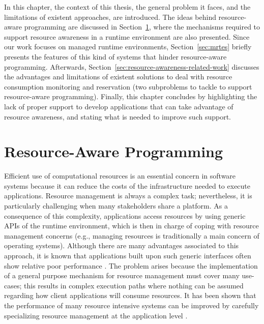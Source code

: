 In this chapter, the context of this thesis, the general problem it faces, and the limitations of existent approaches, are introduced.
The ideas behind resource-aware programming are discussed in Section~\ref{sec:resource-awareness},
where the mechanisms required to support resource awareness in a runtime environment are also presented.
Since our work focuses on managed runtime environments, Section~\ref{sec:mrtes} briefly presents the features of this kind of systems that hinder resource-aware programming.
Afterwards, Section~\ref{sec:resource-awareness-related-work} discusses the advantages and limitations of existent solutions to deal with resource consumption monitoring and reservation (two subproblems to tackle to support resource-aware programming).
Finally, this chapter concludes by highlighting the lack of proper support to develop applications that can take advantage of resource awareness, and stating what is needed to improve such support.

\section{Resource-Aware Programming} \label{sec:resource-awareness}

Efficient use of computational resources is an essential concern in software systems because it can reduce the costs of the infrastructure needed to execute applications.
Resource management is always a complex task; nevertheless, it is particularly challenging when many stakeholders share a platform.
As a consequence of this complexity, applications access resources by using generic APIs of the runtime environment, which is then in charge of coping with resource management concerns (e.g., managing resources is traditionally a main concern of operating systems).
Although there are many advantages associated to this approach, it is known that applications built upon such generic interfaces often show relative poor performance \cite{engler1995exokernel}.
The problem arises because the implementation of a general purpose mechanism for resource management must cover many use-cases; this results in complex execution paths where nothing can be assumed regarding how client applications will consume resources.
It has been shown that the performance of many resource intensive systems can be improved by carefully specializing resource management at the application level \cite{engler1995exokernel,Belay:2014:IPD:2685048.2685053,Marinos:2014:NSS:2619239.2626311}.


